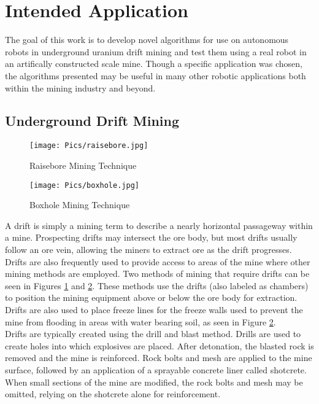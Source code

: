 \section{Intended Application}
\label{sec:prob}
The goal of this work is to develop novel algorithms for use on autonomous robots in underground uranium drift mining and test them using a real robot in an artifically constructed scale mine. Though a specific application was chosen, the algorithms presented may be useful in many other robotic applications both within the mining industry and beyond.\\

\subsection{Underground Drift Mining}

\begin{figure}
    \centering
    \texttt{[image: Pics/raisebore.jpg]}
    \caption{Raisebore Mining Technique \cite{weblink}}
    \label{fig:raisebore}
\end{figure}
\begin{figure}
    \centering
    \texttt{[image: Pics/boxhole.jpg]}
    \caption{Boxhole Mining Technique \cite{weblink}}
    \label{fig:boxhole}
\end{figure}
A drift is simply a mining term to describe a nearly horizontal passageway within a mine. Prospecting drifts may intersect the ore body, but most drifts usually follow an ore vein, allowing the miners to extract ore as the drift progresses. Drifts are also frequently used to provide access to areas of the mine where other mining methods are employed. Two methods of mining that require drifts can be seen in Figures \ref{fig:raisebore} and \ref{fig:boxhole}. These methods use the drifts (also labeled as chambers) to position the mining equipment above or below the ore body for extraction. Drifts are also used to place freeze lines for the freeze walls used to prevent the mine from flooding in areas with water bearing soil, as seen in Figure \ref{fig:boxhole}.\\

Drifts are typically created using the drill and blast method. Drills are used to create holes into which explosives are placed. After detonation, the blasted rock is removed and the mine is reinforced. Rock bolts and mesh are applied to the mine surface, followed by an application of a sprayable concrete liner called shotcrete. When small sections of the mine are modified, the rock bolts and mesh may be omitted, relying on the shotcrete alone for reinforcement.\\

